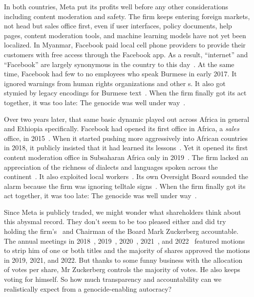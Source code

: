 In both countries, Meta put its profits well before any other considerations
including content moderation and safety. The firm keeps entering foreign
markets, not head but sales office first, even if user interfaces, policy
documents, help pages, content moderation tools, and machine learning models
have not yet been localized. In Myanmar, Facebook paid local cell phone
providers to provide their customers with free access through the Facebook app.
As a result, ``internet'' and ``Facebook'' are largely synonymous in the country
to this day~\cite{Strom2016}. At the same time, Facebook had few to no employees
who speak Burmese in early 2017. It ignored warnings from human rights
organizations and other \NGO{}s. It also got stymied by legacy encodings for
Burmese text~\cite{LaGrowPruzan2019,Wade2022}. When the firm finally got its act
together, it was too late: The genocide was well under
way~\cite{McLaughlin2018,MilkoOrtutay2022,Mozur2018,Ortutay2022}.

Over two years later, that same basic dynamic played out across Africa in
general and Ethiopia specifically. Facebook had opened its first office in
Africa, a \emph{sales} office, in 2015~\cite{Wagner2015}. When it started
pushing more aggressively into African countries in 2018, it publicly insisted
that it had learned its lessons~\cite{Tiku2018}. Yet it opened its first content
moderation office in Subsaharan Africa only in 2019~\cite{Agutu2019}. The firm
lacked an appreciation of the richness of dialects and languages spoken across
the continent~\cite{FickDave2019,JacksonTownsendea2022,Madung2021}. It also
exploited local workers~\cite{AlSibai2022,Perrigo2022,Perrigo2023}. Its own
Oversight Board sounded the alarm because the firm was ignoring telltale
signs~\cite{Faife2021}. When the firm finally got its act together, it was too
late: The genocide was well under
way~\cite{Allen2022,Gilbert2020,GlobalWitness2022,Ilori2020,Malik2022,ElliottChristopherea2021,ZelalemGuest2021,RobinsEarly2021}.

Since Meta is publicly traded, we might wonder what shareholders think about
this abysmal record. They don't seem to be too pleased either and did try
holding the firm's \CEO\ and Chairman of the Board Mark Zuckerberg accountable.
The annual meetings in 2018~\cite{Butler2018}, 2019~\cite{Sumagaysay2019},
2020~\cite{McRitchie2020}, 2021~\cite{Nix2021}, and 2022~\cite{WatersAgnew2022}
featured motions to strip him of one or both titles and the majority of shares
approved the motions in 2019, 2021, and 2022. But thanks to some funny business
with the allocation of votes per share, Mr Zuckerberg controls the majority of
votes. He also keeps voting for himself. So how much transparency and
accountability can we realistically expect from a genocide-enabling autocracy?
